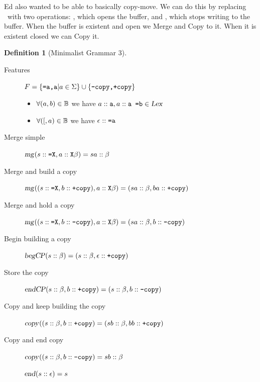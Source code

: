 \documentclass[12pt]{article}
\theoremstyle{definition}
\newtheorem{definition}{Definition}[section]
\begin{document}
\newcommand\bcp{\text{\textsl{begCP}}}
\newcommand\ecp{\text{\textsl{endCP}}}


Ed also wanted to be able to basically copy-move. We can do this by replacing \cl~with two operations: \bcp, which opens the buffer, and \ecp, which stops writing to the buffer. When the buffer is existent and open we Merge and Copy to it. When it is existent closed we can Copy it. 

\begin{definition}[Minimalist Grammar 3]\ 


  \begin{description}
  \item[Features] $F=\{\text{\texttt{=a,a}} | a\in \Sigma \}\cup\{\text{\texttt{-copy,+copy}}\}$

  \item[\Lex]
    \begin{itemize}
    \item $\forall (a,b) \in \mathbb{B}$ we have
      $a::\text{\texttt{a}}, a::\text{\texttt{a =b}} \in \text{\textsl{Lex}}$
    \item $\forall ({[},a)\in\mathbb{B}$ we have $\epsilon::\text{\texttt{=a}}$
    \end{itemize}

  \item[Merge simple] $\text{\textsl{mg}}(s::\text{\texttt{=X}}, a::\text{\texttt{X}}\beta) = sa::\beta$
  \item[Merge and build a copy] $\text{\textsl{mg}}((s::\text{\texttt{=X}},b::\text{\texttt{+copy}}), a::\text{\texttt{X}}\beta) = (sa::\beta,ba::\text{\texttt{+copy}})$
  \item[Merge and hold a copy] $\text{\textsl{mg}}((s::\text{\texttt{=X}},b::\text{\texttt{-copy}}), a::\text{\texttt{X}}\beta) = (sa::\beta,b::\text{\texttt{-copy}})$
  \item[Begin building a copy] $\bcp(s::\beta) = (s::\beta,\emp::\fea{+copy})$
  \item[Store the copy] $\ecp(s::\beta,b::\fea{+copy}) = (s::\beta,b::\fea{-copy})$


  \item[Copy and keep building the copy] $\text{\textsl{copy}}((s::\beta,b::\text{\texttt{+copy}}) = (sb::\beta, bb::\text{\texttt{+copy}})$
  \item[Copy and end copy] $\text{\textsl{copy}}((s::\beta,b::\text{\texttt{-copy}}) = sb::\beta$

  \item[\ed] $\text{\textsl{end}}(s::\epsilon) = s$


  \end{description}


\end{definition}
\end{document}
